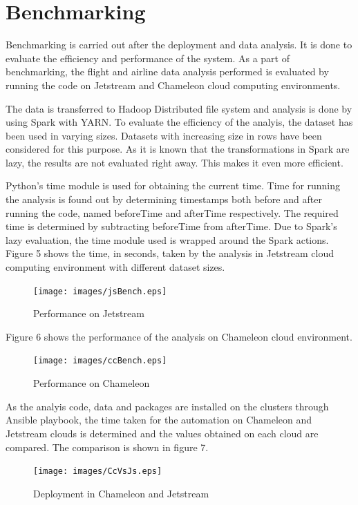 \documentclass[9pt,twocolumn,twoside]{../../styles/osajnl}
\begin{document}
\section{Benchmarking}

Benchmarking is carried out after the deployment and data analysis. It
is done to evaluate the efficiency and performance of the system. As a
part of benchmarking, the flight and airline data analysis performed
is evaluated by running the code on Jetstream and Chameleon cloud
computing environments.

The data is transferred to Hadoop Distributed file system and analysis
is done by using Spark with YARN. To evaluate the efficiency of the
analyis, the dataset has been used in varying sizes. Datasets with
increasing size in rows have been considered for this purpose. As it
is known that the transformations in Spark are lazy, the results are
not evaluated right away. This makes it even more efficient.

Python's time module is used for obtaining the current time. Time for
running the analysis is found out by determining timestamps both
before and after running the code, named beforeTime and afterTime
respectively. The required time is determined by subtracting
beforeTime from afterTime. Due to Spark's lazy evaluation, the time
module used is wrapped around the Spark actions. Figure 5 shows the
time, in seconds, taken by the analysis in Jetstream cloud computing
environment with different dataset sizes.

\begin{figure}[ht]
  \texttt{[image: images/jsBench.eps]}
  \caption{Performance on Jetstream}
\end{figure}

Figure 6 shows the performance of the analysis on Chameleon cloud
environment.

\begin{figure}[ht]
  \texttt{[image: images/ccBench.eps]}
  \caption{Performance on Chameleon}
\end{figure}

As the analyis code, data and packages are installed on the clusters
through Ansible playbook, the time taken for the automation on
Chameleon and Jetstream clouds is determined and the values obtained
on each cloud are compared. The comparison is shown in figure 7.

\begin{figure}[ht]
  \texttt{[image: images/CcVsJs.eps]}
  \caption{Deployment in Chameleon and Jetstream}
\end{figure}
\end{document}
